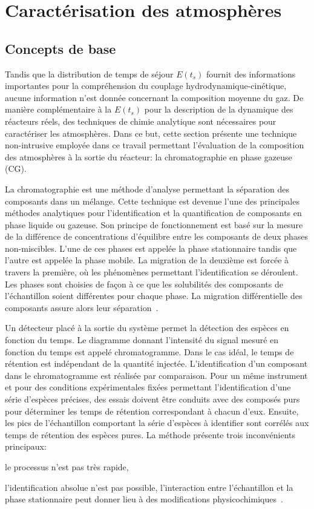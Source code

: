 \chapter{Caractérisation des atmosphères}
\label{an:caracterisation_atmospheres}

\section*{Concepts de base}

Tandis que la distribution de temps de séjour $E(t_{s})$  fournit des informations importantes pour la compréhension du couplage hydrodynamique-cinétique, aucune information n'est donnée concernant la composition moyenne du gaz. De manière complémentaire à la $E(t_{s})$ pour la description de la dynamique des réacteurs réels, des techniques de chimie analytique sont nécessaires pour caractériser les atmosphères. Dans ce but, cette section présente une technique non-intrusive employée dans ce travail permettant l'évaluation de la composition des atmosphères à la sortie du réacteur: la chromatographie en phase gazeuse (CG).

La chromatographie est une méthode d'analyse permettant la séparation des composants dans un mélange. Cette technique est devenue l'une des principales méthodes analytiques pour l'identification et la quantification de composants en phase liquide ou gazeuse. Son principe de fonctionnement est basé sur la mesure de la différence de concentrations d'équilibre entre les composants de deux phases non-miscibles. L'une de ces phases est appelée la phase stationnaire tandis que l'autre est appelée la phase mobile. La migration de la deuxième est forcée à travers la première, où les phénomènes permettant l'identification se déroulent. Les phases sont choisies de façon à ce que les solubilités des composants de l'échantillon soient différentes pour chaque phase. La migration différentielle des composants assure alors leur séparation~\cite{Rouessac2007}.

Un détecteur placé à la sortie du système permet la détection des espèces en fonction du temps. Le diagramme donnant l'intensité du signal mesuré en fonction du temps est appelé chromatogramme. Dans le cas idéal, le temps de rétention est indépendant de la quantité injectée. L'identification d'un composant dans le chromatogramme est réalisée par comparaison. Pour un même instrument et pour des conditions expérimentales fixées permettant l'identification d'une série d'espèces précises, des essais doivent être conduits avec des composés purs pour déterminer les temps de rétention correspondant à chacun d'eux. Ensuite, les pics de l'échantillon comportant la série d'espèces à identifier sont corrélés aux temps de rétention des espèces pures. La méthode présente trois inconvénients principaux: \begin{inparaenum}[(i)] \item le processus n'est pas très rapide, \item l'identification absolue n'est pas possible, l'interaction entre l'échantillon et la phase stationnaire peut donner lieu à des modifications physicochimiques~\cite{Rouessac2007}.\end{inparaenum}

